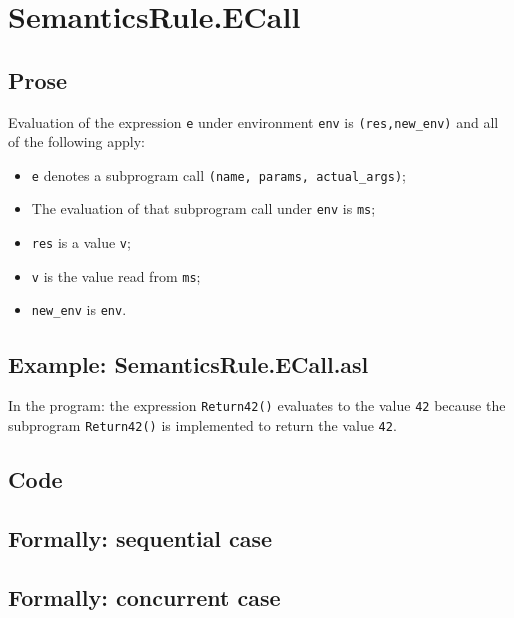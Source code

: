 \documentclass{book}
\begin{document}

\section{SemanticsRule.ECall \label{sec:SemanticsRule.ECall}}

  \subsection{Prose}
  Evaluation of the expression \texttt{e} under environment \texttt{env} is
  \texttt{(res,new\_env)} and all of the following apply:
  \begin{itemize}
  \item \texttt{e} denotes a subprogram call \texttt{(name, params, actual\_args)};
  \item The evaluation of that subprogram call under \texttt{env} is \texttt{ms};
  \item \texttt{res} is a value \texttt{v};
  \item \texttt{v} is the value read from \texttt{ms};
  \item \texttt{new\_env} is \texttt{env}.
  \end{itemize}

  \subsection{Example: SemanticsRule.ECall.asl}
    In the program:
    the expression \texttt{Return42()} evaluates to the value \texttt{42} because the
    subprogram \texttt{Return42()} is implemented to return the value \texttt{42}.

  \subsection{Code}

\begin{emptyformal}
  \subsection{Formally: sequential case}

  \subsection{Formally: concurrent case}
\end{emptyformal}
\end{document}
